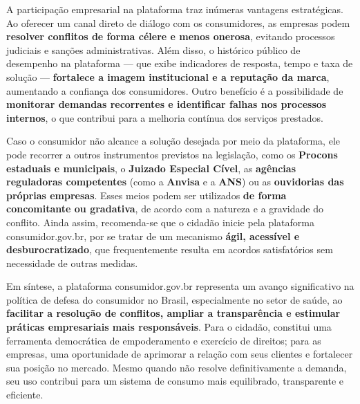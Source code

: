 \documentclass[12pt]{article}
\begin{document}
A participação empresarial na plataforma traz inúmeras vantagens estratégicas. Ao oferecer um canal direto de diálogo com os consumidores, as empresas podem \textbf{resolver conflitos de forma célere e menos onerosa}, evitando processos judiciais e sanções administrativas. Além disso, o histórico público de desempenho na plataforma — que exibe indicadores de resposta, tempo e taxa de solução — \textbf{fortalece a imagem institucional e a reputação da marca}, aumentando a confiança dos consumidores. Outro benefício é a possibilidade de \textbf{monitorar demandas recorrentes e identificar falhas nos processos internos}, o que contribui para a melhoria contínua dos serviços prestados.

Caso o consumidor não alcance a solução desejada por meio da plataforma, ele pode recorrer a outros instrumentos previstos na legislação, como os \textbf{Procons estaduais e municipais}, o \textbf{Juizado Especial Cível}, as \textbf{agências reguladoras competentes} (como a \textbf{Anvisa} e a \textbf{ANS}) ou as \textbf{ouvidorias das próprias empresas}. Esses meios podem ser utilizados \textbf{de forma concomitante ou gradativa}, de acordo com a natureza e a gravidade do conflito. Ainda assim, recomenda-se que o cidadão inicie pela plataforma consumidor.gov.br, por se tratar de um mecanismo \textbf{ágil, acessível e desburocratizado}, que frequentemente resulta em acordos satisfatórios sem necessidade de outras medidas.

Em síntese, a plataforma consumidor.gov.br representa um avanço significativo na política de defesa do consumidor no Brasil, especialmente no setor de saúde, ao \textbf{facilitar a resolução de conflitos, ampliar a transparência e estimular práticas empresariais mais responsáveis}. Para o cidadão, constitui uma ferramenta democrática de empoderamento e exercício de direitos; para as empresas, uma oportunidade de aprimorar a relação com seus clientes e fortalecer sua posição no mercado. Mesmo quando não resolve definitivamente a demanda, seu uso contribui para um sistema de consumo mais equilibrado, transparente e eficiente.
\end{document}
